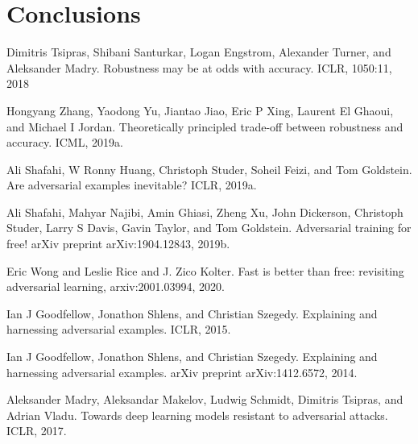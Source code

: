 \documentclass{article}
\begin{document}
\section{Conclusions}

\begin{thebibliography}{100} 
	 {Dimitris Tsipras, Shibani Santurkar, Logan Engstrom, Alexander Turner, and Aleksander Madry. Robustness may be at odds with accuracy. ICLR, 1050:11, 2018}

	 {Hongyang Zhang, Yaodong Yu, Jiantao Jiao, Eric P Xing, Laurent El Ghaoui, and Michael I Jordan. Theoretically principled trade-off between robustness and accuracy. ICML, 2019a.}
	
	 {Ali Shafahi, W Ronny Huang, Christoph Studer, Soheil Feizi, and Tom Goldstein. Are adversarial examples inevitable? ICLR, 2019a.}
	
	 {Ali Shafahi, Mahyar Najibi, Amin Ghiasi, Zheng Xu, John Dickerson, Christoph Studer, Larry S
		Davis, Gavin Taylor, and Tom Goldstein. Adversarial training for free!
		arXiv preprint
		arXiv:1904.12843, 2019b.}
	
	 {Eric Wong and Leslie Rice and J. Zico Kolter. Fast is better than free: revisiting adversarial learning, arxiv:2001.03994, 2020.}
	
	 {Ian J Goodfellow, Jonathon Shlens, and Christian Szegedy. Explaining and harnessing adversarial examples. ICLR, 2015.}
	
	 {Ian J Goodfellow, Jonathon Shlens, and Christian Szegedy. Explaining and harnessing adversarial examples. arXiv preprint arXiv:1412.6572, 2014.}
	
	 {Aleksander Madry, Aleksandar Makelov, Ludwig Schmidt, Dimitris Tsipras, and Adrian Vladu. Towards deep learning models resistant to adversarial attacks. ICLR, 2017.}
	
\end{thebibliography}
	
\end{document}
